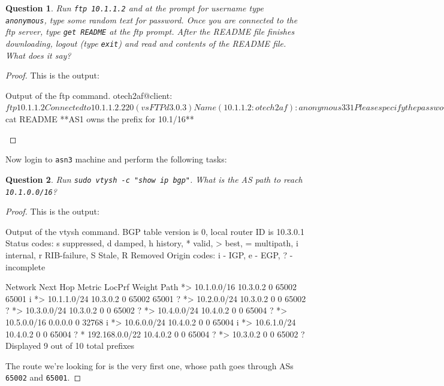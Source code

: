 \documentclass[a4paper,11pt,hidelinks]{article}
\newtheorem{theorem}{Question}[subsection]
\begin{document}
\begin{theorem}
    Run \verb=ftp 10.1.1.2= and at the prompt for username type \verb=anonymous=, type some random text for password. Once you are connected to the ftp server, type \verb=get README= at the ftp prompt. After the README file finishes downloading, logout (type \verb=exit=) and read and contents of the README file. What does it say?
\end{theorem}

\begin{proof}
    This is the output:

\begin{code}{Output of the ftp command.}
otech2af@client:~$ ftp 10.1.1.2
Connected to 10.1.1.2.
220 (vsFTPd 3.0.3)
Name (10.1.1.2:otech2af): anonymous
331 Please specify the password.
Password:
230 Login successful.
Remote system type is UNIX.
Using binary mode to transfer files.
ftp> get README
local: README remote: README
200 PORT command successful. Consider using PASV.
150 Opening BINARY mode data connection for README (32 bytes).
226 Transfer complete. 32 bytes received in 0.00 secs (12.3959 kB/s)

otech2af@client:~$ cat README
**AS1 owns the prefix for 10.1/16**
\end{code}
\end{proof}

Now login to \verb=asn3= machine and perform the following tasks:

\begin{theorem}
    Run \verb=sudo vtysh -c "show ip bgp"=. What is the AS path to reach \verb=10.1.0.0/16=?
\end{theorem}

\begin{proof}
    This is the output:

\begin{code}{Output of the vtysh command.}
BGP table version is 0, local router ID is 10.3.0.1
Status codes: s suppressed, d damped, h history, * valid, > best, = multipath,
              i internal, r RIB-failure, S Stale, R Removed
Origin codes: i - IGP, e - EGP, ? - incomplete

   Network          Next Hop            Metric LocPrf Weight Path
*> 10.1.0.0/16      10.3.0.2                               0 65002 65001 i
*> 10.1.1.0/24      10.3.0.2                               0 65002 65001 ?
*> 10.2.0.0/24      10.3.0.2                 0             0 65002 ?
*> 10.3.0.0/24      10.3.0.2                 0             0 65002 ?
*> 10.4.0.0/24      10.4.0.2                 0             0 65004 ?
*> 10.5.0.0/16      0.0.0.0                  0         32768 i
*> 10.6.0.0/24      10.4.0.2                 0             0 65004 i
*> 10.6.1.0/24      10.4.0.2                 0             0 65004 ?
*  192.168.0.0/22   10.4.0.2                 0             0 65004 ?
*>                  10.3.0.2                 0             0 65002 ?
Displayed  9 out of 10 total prefixes
\end{code}

    The route we're looking for is the very first one, whose path goes through ASs \verb=65002= and \verb=65001=.
\end{proof}
\end{document}
